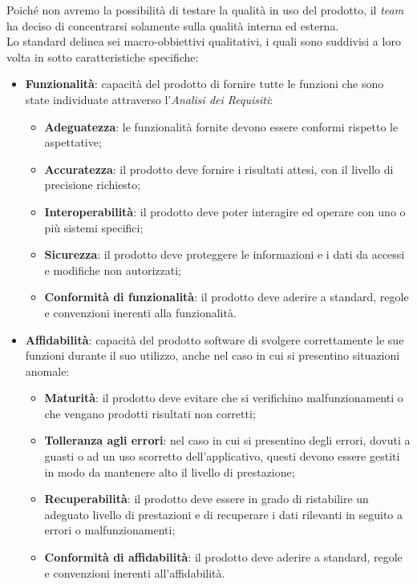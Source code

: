 Poiché non avremo la possibilità di testare la qualità in uso del prodotto, il \textit{team} ha deciso di concentrarsi solamente sulla qualità interna ed esterna. \\ Lo standard delinea sei macro-obbiettivi qualitativi, i quali sono suddivisi a loro volta in sotto caratteristiche specifiche:
\begin{itemize}
\item\textbf{Funzionalità}: capacità del prodotto di fornire tutte le funzioni che sono state individuate attraverso l'\textit{Analisi dei Requisiti}:
\begin{itemize}
\item\textbf{Adeguatezza}: le funzionalità fornite devono essere conformi rispetto le aspettative;
\item\textbf{Accuratezza}: il prodotto deve fornire i risultati attesi, con il livello di precisione richiesto;
\item\textbf{Interoperabilità}: il prodotto deve poter interagire ed operare con uno o più sistemi specifici;
\item\textbf{Sicurezza}: il prodotto deve proteggere le informazioni e i dati da accessi e modifiche non autorizzati;
\item\textbf{Conformità di funzionalità}: il prodotto deve aderire a standard, regole e convenzioni inerenti alla funzionalità.
\end{itemize}
\item\textbf{Affidabilità}: capacità del prodotto software di svolgere correttamente le sue funzioni durante il suo utilizzo, anche nel caso in cui si presentino situazioni anomale:
\begin{itemize}
\item\textbf{Maturità}: il prodotto deve evitare che si verifichino malfunzionamenti o che vengano prodotti risultati non corretti;
\item\textbf{Tolleranza agli errori}: nel caso in cui si presentino degli errori, dovuti a guasti o ad un uso scorretto dell'applicativo, questi devono essere gestiti in modo da mantenere alto il livello di prestazione;
\item\textbf{Recuperabilità}: il prodotto deve essere in grado di ristabilire un
adeguato livello di prestazioni e di recuperare i dati rilevanti in seguito a errori o malfunzionamenti;
\item\textbf{Conformità di affidabilità}: il prodotto deve aderire a standard, regole e convenzioni inerenti all'affidabilità.
\end{itemize}

\end{itemize}
